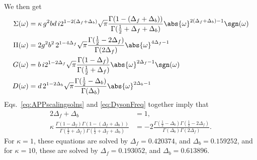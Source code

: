 We then get 
\begin{subequations}
\begin{align}
    \Sigma(\omega) &= \kappa \, g^2 bd \, i2^{1-2(\Delta_f + \Delta_b)}\sqrt{\pi}\frac{\Gamma(1-(\Delta_f+\Delta_b))}{\Gamma(\frac{1}{2} + \Delta_f + \Delta_b)} \abs{\omega}^{2(\Delta_f+\Delta_b)-1}\sgn(\omega) \\
    \Pi(\omega) &= 2g^2b^2 \, 2^{1-4\Delta_f}\sqrt{\pi} \frac{\Gamma(\frac{1}{2} - 2\Delta_f)}{\Gamma(2\Delta_f)}\abs{\omega}^{4\Delta_f-1}\\
    G(\omega) &= b\,i2^{1-2\Delta_f}\sqrt{\pi}\frac{\Gamma(1-\Delta_f)}{\Gamma(\frac{1}{2}+\Delta_f)}\abs{\omega}^{2\Delta_f-1}\sgn(\omega) \\
    D(\omega) &= d\,2^{1-2\Delta_b}\sqrt{\pi}\frac{\Gamma(\frac{1}{2}-\Delta_b)}{\Gamma(\Delta_b)} \abs{\omega}^{2\Delta_b-1}
\end{align}
    \label{eq:APPscalingsolns}
\end{subequations}
Eqs.~\eqref{eq:APPscalingsolns} and \eqref{eq:DysonFreq} together imply that
\begin{align}
    2\Delta_f + \Delta_b &= 1 ,\\
    \kappa \, \frac{\Gamma(1-\Delta_f)\Gamma(1-(\Delta_f+\Delta_b))}{\Gamma(\frac{1}{2}+\Delta_f)\Gamma(\frac{1}{2}+\Delta_f+\Delta_b)} &= -2 \frac{\Gamma(\frac{1}{2}-\Delta_b)\Gamma(\frac{1}{2}-2\Delta_f)}{\Gamma(\Delta_b)\Gamma(2\Delta_f)}.
\end{align}
For $\kappa = 1$, these equations are solved by $\Delta_f = 0.420374$, and $\Delta_b = 0.159252$, and for $\kappa=10$, these are solved by $\Delta_f = 0.193052$, and $\Delta_b = 0.613896$.

